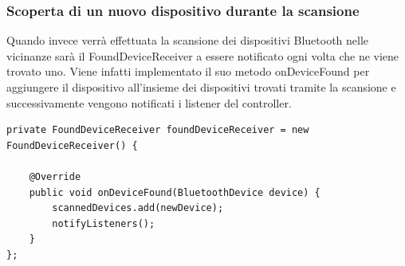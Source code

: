 \subsubsection{Scoperta di un nuovo dispositivo durante la scansione}
Quando invece verrà effettuata la scansione dei dispositivi Bluetooth nelle vicinanze sarà il FoundDeviceReceiver a essere notificato ogni volta che ne viene trovato uno. Viene infatti implementato il suo metodo onDeviceFound per aggiungere il dispositivo all'insieme dei dispositivi trovati tramite la scansione e successivamente vengono notificati i listener del controller.
\begin{verbatim}
private FoundDeviceReceiver foundDeviceReceiver = new FoundDeviceReceiver() {

    @Override
    public void onDeviceFound(BluetoothDevice device) {
        scannedDevices.add(newDevice);
        notifyListeners();
    }
};
\end{verbatim}

